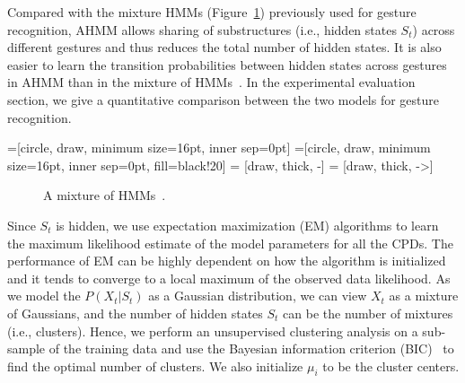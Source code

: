\documentclass{sigchi}
\begin{document}
Compared with the mixture HMMs (Figure~\ref{fig:hmms}) previously used for gesture recognition,
AHMM allows sharing of substructures (i.e., hidden states $S_t$) across
different gestures and thus reduces the total number of hidden states. It is
also easier to learn the transition probabilities between hidden states across
gestures in AHMM than in the mixture of HMMs~\cite{murphy02}. In the experimental evaluation section, we give
a quantitative comparison between the two models for gesture recognition.

=[circle, draw, minimum size=16pt, inner sep=0pt]
=[circle, draw, minimum size=16pt, inner
sep=0pt, fill=black!20] 
 = [draw, thick, -]
 = [draw, thick, ->]

\begin{figure}[tb]
\centering
  \caption{A mixture of HMMs~\cite{murphy02}.}
  \label{fig:hmms}
\end{figure}

Since $S_t$ is hidden, we use expectation maximization (EM)
algorithms to learn the maximum likelihood estimate of the model parameters for
all the CPDs. The performance of EM can be highly dependent on how the algorithm
is initialized~\cite{dicintio2012} and it tends to converge to a local maximum
of the observed data likelihood. As we model the $P(X_t | S_t)$ as a Gaussian
distribution, we can view $X_t$ as a mixture of Gaussians, and the number of hidden states 
$S_t$ can be the number of mixtures (i.e., clusters). Hence, we
perform an unsupervised clustering analysis on a sub-sample of the training data and
use the Bayesian information criterion (BIC)~\cite{fraley12} to find the optimal
number of clusters. We also initialize $\mu_i$ to be the cluster centers.
\end{document}
